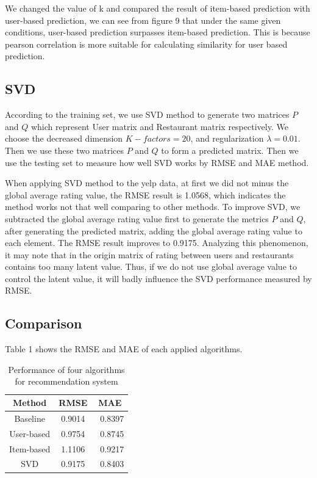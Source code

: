 \documentclass{llncs}
\begin{document}
We changed the value of k and compared the result of item-based prediction with user-based prediction, we can see from figure 9 that under the same given conditions, user-based prediction surpasses item-based prediction. This is because pearson correlation is more suitable for calculating similarity for user based prediction. 

\subsection{SVD}
According to the training set, we use SVD method to generate two matrices $P$ and $Q$ which represent User matrix and Restaurant matrix respectively. We choose the decreased dimension $K-factors = 20$, and regularization $\lambda = 0.01$. Then we use these two matrices $P$ and $Q$ to form a predicted matrix. Then we use the testing set to measure how well SVD works by RMSE and MAE method.

When applying SVD method to the yelp data, at first we did not minus the global average rating value, the RMSE result is 1.0568, which indicates the method works not that well comparing to other methods. To improve SVD, we subtracted the global average rating value first to generate the metrics $P$ and $Q$, after generating the predicted matrix, adding the global average rating value to each element. The RMSE result improves to  0.9175. Analyzing this phenomenon, it may note that in the origin matrix of rating between users and restaurants contains too many latent value. Thus, if we do not use global average value to control the latent value, it will badly influence the SVD performance measured by RMSE.

\subsection{Comparison}
Table 1 shows the RMSE and MAE of each applied algorithms.
\begin{table}
	\caption{Performance of four algorithms for recommendation system}
	\begin{center}
		\begin{tabular}{ccc}
			\hline
				\rule{0pt}{12pt}Method  & \rule{0pt}{12pt}RMSE   &\rule{0pt}{12pt} MAE\\
			\hline\rule{0pt}{12pt}
			Baseline    &   0.9014 & \ 	0.8397 \\
			User-based  &   0.9754 & \ 	0.8745\\
			Item-based  &   1.1106 & \      0.9217\\
			SVD         &   0.9175 & \      0.8403\\
			\hline
		\end{tabular}
	\end{center}
\end{table}
\end{document}
